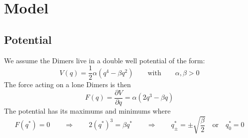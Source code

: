	\section{Model}
	\subsection{Potential}
	We assume the Dimers live in a double well potential of the form:
	\begin{equation}
		V(q) = \frac{1}{2}	\alpha \left(q^4 - \beta q^2 \right) \qquad \text{with} \qquad \alpha, \beta > 0
	\end{equation}
	The force acting on a lone Dimers is then
	\begin{equation}
		F(q) =	\frac{\partial V}{\partial q} =	\alpha \left(2q^3 - \beta q \right)
	\end{equation}
	The potential has its maximums and minimums where
	\begin{equation}
		F(q^*) = 0 \qquad \Rightarrow \qquad 2(q^*)^3 =	\beta q^* \qquad \Rightarrow \qquad q^*_\pm = \pm	\sqrt{\frac{\beta}{2}} \quad \text{or} \quad q^*_0 = 0
	\end{equation}
	
